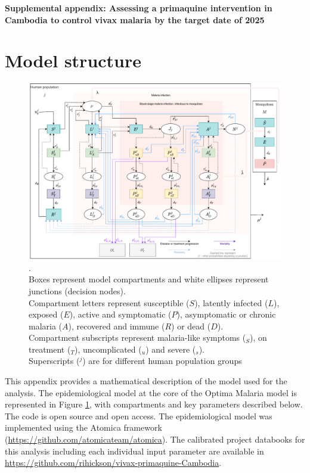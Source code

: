 \documentclass[doublespacing]{bmcart}
\begin{document}
\textbf{Supplemental appendix: Assessing a primaquine intervention in Cambodia to control vivax malaria by the target date of 2025}\label{supp}

\section*{Model structure}

\begin{figure}[h!]
\includegraphics[width=.95\linewidth]{Optima_Malaria_model_diagram_technical.pdf}\caption{.\\
Boxes represent model compartments and white ellipses represent junctions (decision nodes).\\ Compartment letters represent susceptible ($S$), latently infected ($L$), exposed ($E$), active and symptomatic ($P$), asymptomatic or chronic malaria ($A$), recovered and immune ($R$) or dead ($D$).\\
Compartment subscripts represent malaria-like symptoms ($_S$), on treatment ($_T$), uncomplicated ($_u$) and severe ($_s$).\\
Superscripts ($^j$) are for different human population groups}\label{fig:model_flow_technical}
\end{figure}

This appendix provides a mathematical description of the model used for the analysis. The epidemiological model at the core of the Optima Malaria model is represented in Figure \ref{fig:model_flow_technical}, with compartments and key parameters described below. The code is open source and open access. The epidemiological model was implemented using the Atomica framework (\url{https://github.com/atomicateam/atomica}). The calibrated project databooks for this analysis including each individual input parameter are available in \url{https://github.com/rihickson/vivax-primaquine-Cambodia}.
\end{document}
